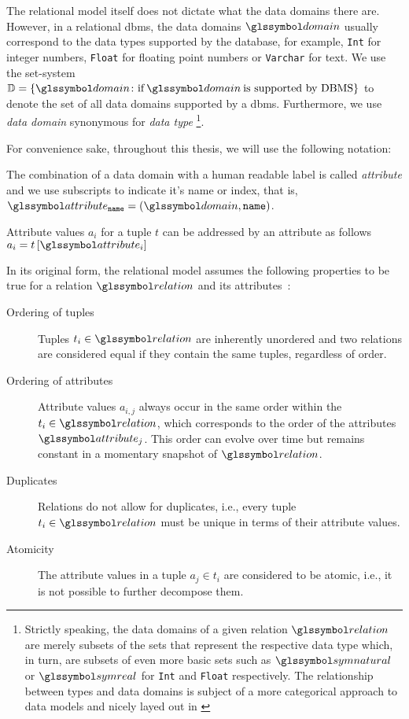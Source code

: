 The relational model itself does not dictate what the data domains there are. However, in a relational \acrshort{dbms}, the data domains $\domain$ usually correspond to the data types supported by the database, for example, \lstinline{Int} for integer numbers, \lstinline{Float} for floating point numbers or \lstinline{Varchar} for text. We use the set-system $\mathbb{D} = \{ \domain \colon \textrm{if} \: \domain \: \textrm{is supported by DBMS} \}$ to denote the set of all data domains supported by a \gls{dbms}. Furthermore, we use \emph{data domain} synonymous for \emph{data type} \footnote{Strictly speaking, the data domains of a given relation $\relation$ are merely subsets of the sets that represent the respective data type which, in turn, are subsets of even more basic sets such as $\symnatural$ or $\symreal$ for \lstinline{Int} and \lstinline{Float} respectively. The relationship between types and data domains is subject of a more categorical approach to data models and nicely layed out in \cite{Spivak:2009Simplicial}}.

For convenience sake, throughout this thesis, we will use the following notation:
\begin{enumerate*}[label=(\roman*)]
    \item  The combination of a data domain with a human readable label is called \emph{attribute} and we use subscripts to indicate it's name or index, that is, $\attribute_{\mathtt{name}} = (\domain, \mathtt{name})$. 
    \item Attribute values $a_i$ for a tuple $t$ can be addressed by an attribute as follows $a_i = t\left[ \attribute_i \right]$
\end{enumerate*}

In its original form, the relational model assumes the following properties to be true for a relation $\relation$ and its attributes~\cite{Codd:1970Relational}:

\begin{description}
    \item[Ordering of tuples] Tuples $t_i \in \relation$ are inherently unordered and two relations are considered equal if they contain the same tuples, regardless of order.
    \item[Ordering of attributes] Attribute values $a_{i,j}$ always occur in the same order within the $t_i \in \relation$, which corresponds to the order of the attributes $\attribute_j$. This order can evolve over time but remains constant in a momentary snapshot of $\relation$.
    \item[Duplicates] Relations do not allow for duplicates, i.e., every tuple $t_i \in \relation$ must be unique in terms of their attribute values.
    \item[Atomicity] The attribute values in a tuple $a_j \in t_i$ are considered to be atomic, i.e., it is not possible to further decompose them.
\end{description}

